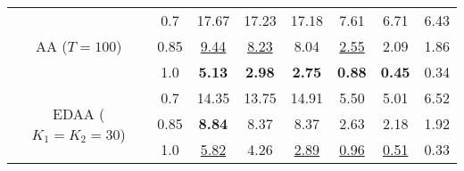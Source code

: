 {\begin{tabular}{c|c|ccc|ccc}
\multirow{3}{*}{AA ($T=100$)}   
      & 0.7      &  17.67   &   17.23   &  17.18    &   7.61    &   6.71    &  6.43 \\
      & 0.85     &   \underline{9.44}  &  \underline{8.23}    &   8.04   &   \underline{2.55}    &   2.09    &  1.86  \\
      & 1.0      &   \textbf{5.13}  &   \textbf{2.98}   &   \textbf{2.75}   &   \textbf{0.88}    &   \textbf{0.45}    &  0.34  \\ 
\hline
\multirow{3}{*}{EDAA ($K_1=K_2=30$)}   
      & 0.7      &   14.35   &  13.75   &   14.91   &   5.50   &   5.01   &  6.52 \\
      & 0.85     &  \textbf{8.84}   &  8.37   &  8.37    &   2.63   &   2.18   &  1.92  \\
      & 1.0      &  \underline{5.82}   &  4.26   &   \underline{2.89}   &   \underline{0.96}   &  \underline{0.51}    &  0.33  \\
\bottomrule
\end{tabular}
}